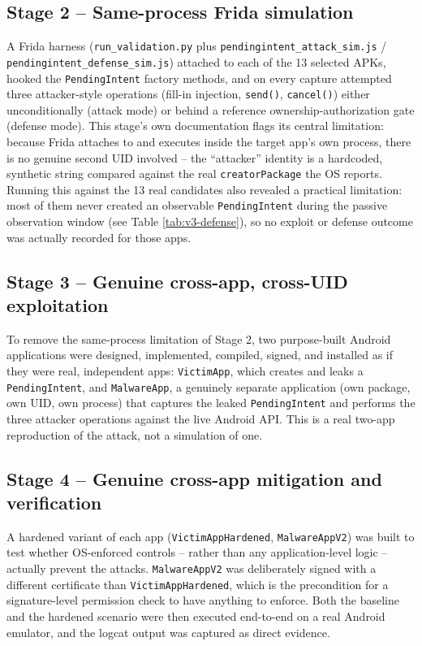 \documentclass[11pt]{article}
\begin{document}
\subsection*{Stage 2 -- Same-process Frida simulation}
A Frida harness (\texttt{run\_validation.py} plus \texttt{pendingintent\_attack\_sim.js}
/ \texttt{pendingintent\_defense\_sim.js}) attached to each of the 13 selected APKs,
hooked the \texttt{PendingIntent} factory methods, and on every capture attempted three
attacker-style operations (fill-in injection, \texttt{send()}, \texttt{cancel()}) either
unconditionally (attack mode) or behind a reference ownership-authorization gate
(defense mode). This stage's own documentation flags its central limitation: because
Frida attaches to and executes inside the target app's own process, there is no genuine
second UID involved -- the ``attacker'' identity is a hardcoded, synthetic string
compared against the real \texttt{creatorPackage} the OS reports. Running this against
the 13 real candidates also revealed a practical limitation: most of them never created
an observable \texttt{PendingIntent} during the passive observation window (see Table
\ref{tab:v3-defense}), so no exploit or defense outcome was actually recorded for those
apps.

\subsection*{Stage 3 -- Genuine cross-app, cross-UID exploitation}
To remove the same-process limitation of Stage 2, two purpose-built Android applications
were designed, implemented, compiled, signed, and installed as if they were real,
independent apps: \texttt{VictimApp}, which creates and leaks a
\texttt{PendingIntent}, and \texttt{MalwareApp}, a genuinely separate application (own
package, own UID, own process) that captures the leaked \texttt{PendingIntent} and
performs the three attacker operations against the live Android API. This is a real
two-app reproduction of the attack, not a simulation of one.

\subsection*{Stage 4 -- Genuine cross-app mitigation and verification}
A hardened variant of each app (\texttt{VictimAppHardened}, \texttt{MalwareAppV2}) was
built to test whether OS-enforced controls -- rather than any application-level logic --
actually prevent the attacks. \texttt{MalwareAppV2} was deliberately signed with a
different certificate than \texttt{VictimAppHardened}, which is the precondition for a
signature-level permission check to have anything to enforce. Both the baseline and the
hardened scenario were then executed end-to-end on a real Android emulator, and the
logcat output was captured as direct evidence.
\end{document}
